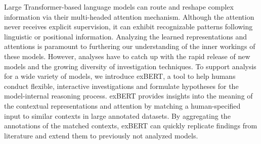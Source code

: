 Large Transformer-based language models can route and reshape complex information via their multi-headed attention mechanism. Although the attention never receives explicit supervision, it can exhibit recognizable patterns following linguistic or positional information. Analyzing the learned representations and attentions is paramount to furthering our understanding of the inner workings of these models. However, analyses have to catch up with the rapid release of new models and the growing diversity of investigation techniques.  To support analysis for a wide variety of models, we introduce exBERT, a tool to help humans conduct flexible, interactive investigations and formulate hypotheses for the model-internal reasoning process. exBERT provides insights into the meaning of the contextual representations and attention by matching a human-specified input to similar contexts in large annotated datasets. By aggregating the annotations of the matched contexts, exBERT can quickly replicate findings from literature and extend them to previously not analyzed models.

